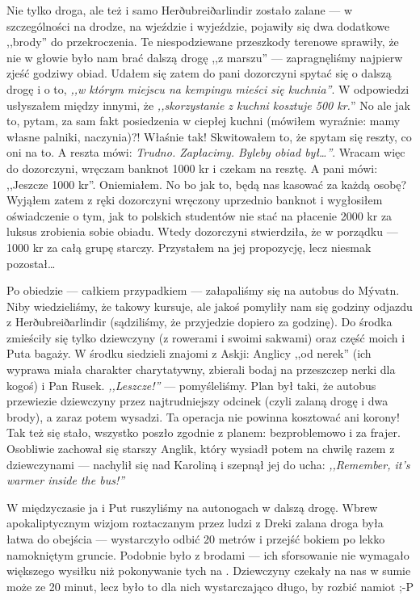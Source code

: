 Nie tylko droga, ale też i samo Herðubreiðarlindir zostało zalane --- w szczególności na drodze, na wjeździe i wyjeździe, pojawiły się dwa dodatkowe ,,brody'' do przekroczenia. Te niespodziewane przeszkody terenowe sprawiły, że nie w głowie było nam brać dalszą drogę ,,z marszu'' --- zapragnęliśmy najpierw zjeść godziwy obiad. Udałem się zatem do pani dozorczyni spytać się o dalszą drogę i o to, \emph{,,w którym miejscu na kempingu mieści się kuchnia''}. W odpowiedzi usłyszałem między innymi, że \emph{,,skorzystanie z kuchni kosztuje 500 kr.}'' No ale jak to, pytam, za sam fakt posiedzenia w ciepłej kuchni (mówiłem wyraźnie: mamy własne palniki, naczynia)?! Właśnie tak! Skwitowałem to, że spytam się reszty, co oni na to. A reszta mówi: \emph{Trudno. Zapłacimy. Byleby obiad był…''}. Wracam więc do dozorczyni, wręczam banknot 1000 kr i czekam na resztę. A pani mówi: ,,Jeszcze 1000 kr''. Oniemiałem. No bo jak to, będą nas kasować za każdą osobę? Wyjąłem zatem z ręki dozorczyni wręczony uprzednio banknot i wygłosiłem oświadczenie o tym, jak to polskich studentów nie stać na płacenie 2000 kr za luksus zrobienia sobie obiadu. Wtedy dozorczyni stwierdziła, że w porządku --- 1000 kr za całą grupę starczy. Przystałem na jej propozycję, lecz niesmak pozostał…

Po obiedzie --- całkiem przypadkiem --- załapaliśmy się na autobus do Mývatn. Niby wiedzieliśmy, że takowy kursuje, ale jakoś pomyliły nam się godziny odjazdu z Herðubreiðarlindir (sądziliśmy, że przyjedzie dopiero za godzinę). Do środka zmieściły się tylko dziewczyny (z rowerami i swoimi sakwami) oraz część moich i Puta bagaży. W środku siedzieli znajomi z Askji: Anglicy ,,od nerek'' (ich wyprawa miała charakter charytatywny, zbierali bodaj na przeszczep nerki dla kogoś) i Pan Rusek. \emph{,,Leszcze!''} --- pomyśleliśmy. Plan był taki, że autobus przewiezie dziewczyny przez najtrudniejszy odcinek (czyli zalaną drogę i dwa brody), a zaraz potem wysadzi. Ta operacja nie powinna kosztować ani korony! Tak też się stało, wszystko poszło zgodnie z planem: bezproblemowo i za frajer. Osobliwie zachował się starszy Anglik, który wysiadł potem na chwilę razem z dziewczynami --- nachylił się nad Karoliną i szepnął jej do ucha: \emph{,,Remember, it’s warmer inside the bus!''}

W międzyczasie ja i Put ruszyliśmy na autonogach w dalszą drogę. Wbrew apokaliptycznym wizjom roztaczanym przez ludzi z Dreki zalana droga była łatwa do obejścia --- wystarczyło odbić 20 metrów i przejść bokiem po lekko namokniętym gruncie. Podobnie było z brodami --- ich sforsowanie nie wymagało większego wysiłku niż pokonywanie tych na . Dziewczyny czekały na nas w sumie może ze 20 minut, lecz było to dla nich wystarczająco długo, by rozbić namiot ;-P

